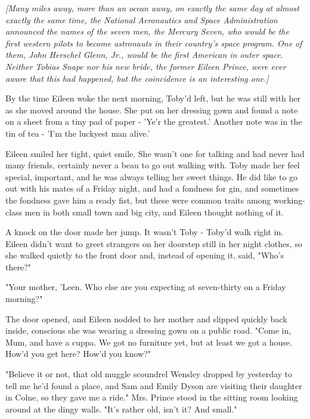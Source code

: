 \vspace{\baselineskip}

\emph{[Many miles away, more than an ocean away, on exactly the same day at almost exactly the same time, the National Aeronautics and Space Administration announced the names of the seven men, the Mercury Seven, who would be the first western pilots to become astronauts in their country's space program. One of them, John Herschel Glenn, Jr., would be the first American in outer space. Neither Tobias Snape nor his new bride, the former Eileen Prince, were ever aware that this had happened, but the coincidence is an interesting one.]}

\vspace{\baselineskip}

By the time Eileen woke the next morning, Toby'd left, but he was still with her as she moved around the house. She put on her dressing gown and found a note on a sheet from a tiny pad of paper - 'Ye'r the greatest.' Another note was in the tin of tea - 'I'm the luckyest man alive.'

Eileen smiled her tight, quiet smile. She wasn't one for talking and had never had many friends, certainly never a beau to go out walking with. Toby made her feel special, important, and he was always telling her sweet things. He did like to go out with his mates of a Friday night, and had a fondness for gin, and sometimes the fondness gave him a ready fist, but these were common traits among working-class men in both small town and big city, and Eileen thought nothing of it.

A knock on the door made her jump. It wasn't Toby - Toby'd walk right in. Eileen didn't want to greet strangers on her doorstep still in her night clothes, so she walked quietly to the front door and, instead of opening it, said, "Who's there?"

"Your mother, 'Leen. Who else are you expecting at seven-thirty on a Friday morning?"

The door opened, and Eileen nodded to her mother and slipped quickly back inside, conscious she was wearing a dressing gown on a public road. "Come in, Mum, and have a cuppa. We got no furniture yet, but at least we got a house. How'd you get here? How'd you know?"

"Believe it or not, that old muggle scoundrel Wensley dropped by yesterday to tell me he'd found a place, and Sam and Emily Dyson are visiting their daughter in Colne, so they gave me a ride." Mrs. Prince stood in the sitting room looking around at the dingy walls. "It's rather old, isn't it? And small."

